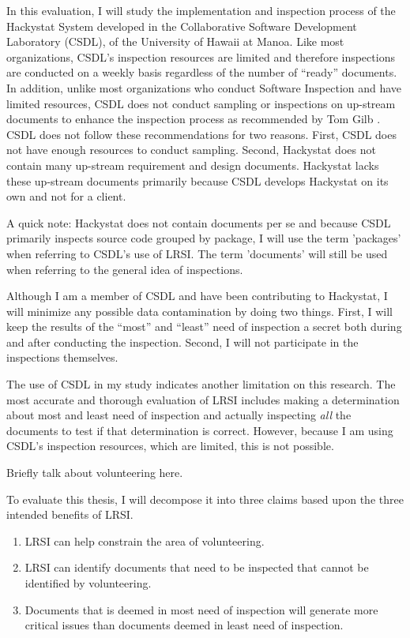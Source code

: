In this evaluation, I will study the implementation and inspection process
of the Hackystat System developed in the Collaborative Software Development
Laboratory (CSDL), of the University of Hawaii at Manoa. Like most
organizations, CSDL's inspection resources are limited and therefore
inspections are conducted on a weekly basis regardless of the number of
``ready'' documents. In addition, unlike most organizations who conduct
Software Inspection and have limited resources, CSDL does not conduct
sampling or inspections on up-stream documents to enhance the inspection
process as recommended by Tom Gilb \cite{Gilb93}. CSDL does not follow
these recommendations for two reasons.  First, CSDL does not have enough
resources to conduct sampling. Second, Hackystat does not contain many
up-stream requirement and design documents. Hackystat lacks these up-stream
documents primarily because CSDL develops Hackystat on its own and not for
a client.

A quick note: Hackystat does not contain documents per se and because CSDL
primarily inspects source code grouped by package, I will use the term
'packages' when referring to CSDL's use of LRSI. The term 'documents' will
still be used when referring to the general idea of inspections.

Although I am a member of CSDL and have been contributing to Hackystat, I
will minimize any possible data contamination by doing two things. First, I
will keep the results of the ``most'' and ``least'' need of inspection a
secret both during and after conducting the inspection. Second, I will not
participate in the inspections themselves.

The use of CSDL in my study indicates another limitation on this research.
The most accurate and thorough evaluation of LRSI includes making a
determination about most and least need of inspection and actually
inspecting \textit{all} the documents to test if that determination is
correct.  However, because I am using CSDL's inspection resources, which
are limited, this is not possible.

\hspace*{1pt}

Briefly talk about volunteering here. 

\hspace*{1pt}

To evaluate this thesis, I will decompose it into three claims based upon
the three intended benefits of LRSI.

\begin{enumerate}
\item LRSI can help constrain the area of volunteering.
\item LRSI can identify documents that need to be inspected that cannot be
  identified by volunteering. 
\item Documents that is deemed in most need of inspection will generate
  more critical issues than documents deemed in least need of inspection.
\end{enumerate}


